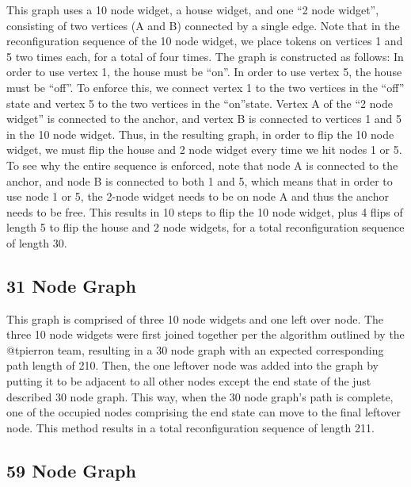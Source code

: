 \documentclass{article}
\begin{document}
This graph uses a 10 node widget, a house widget, and one ``2 node widget'', consisting of two vertices (A and B) connected by a single edge.
Note that in the reconfiguration sequence of the 10 node widget, we place tokens on vertices 1 and 5 two times each, for a total of four times.
The graph is constructed as follows: In order to use vertex 1, the house must be ``on''. In order to use vertex 5, the house must be ``off''.
To enforce this, we connect vertex 1 to the two vertices in the ``off'' state and vertex 5 to the two vertices in the ``on''state.
Vertex A of the ``2 node widget'' is connected to the anchor, and vertex B is connected to vertices 1 and 5 in the 10 node widget.
Thus, in the resulting graph, in order to flip the 10 node widget, we must flip the house and 2 node widget every time we hit nodes 1 or 5.
To see why the entire sequence is enforced, note that node A is connected to the anchor, and node B is connected to both 1 and 5, which means that in order to use node 1 or 5, the 2-node widget needs to be on node A and thus the anchor needs to be free.
This results in 10 steps to flip the 10 node widget, plus 4 flips of length 5 to flip the house and 2 node widgets, for a total reconfiguration sequence of length 30.

\subsection{31 Node Graph}

This graph is comprised of three 10 node widgets and one left over node. The three 10 node widgets were first joined together per the algorithm outlined by the @tpierron team, resulting in a 30 node graph with an expected corresponding path length of 210. Then, the one leftover node was added into the graph by putting it to be adjacent to all other nodes except the end state of the just described 30 node graph. This way, when the 30 node graph's path is complete, one of the occupied nodes comprising the end state can move to the final leftover node. This method results in a total reconfiguration sequence of length 211.

\subsection{59 Node Graph}
\end{document}
